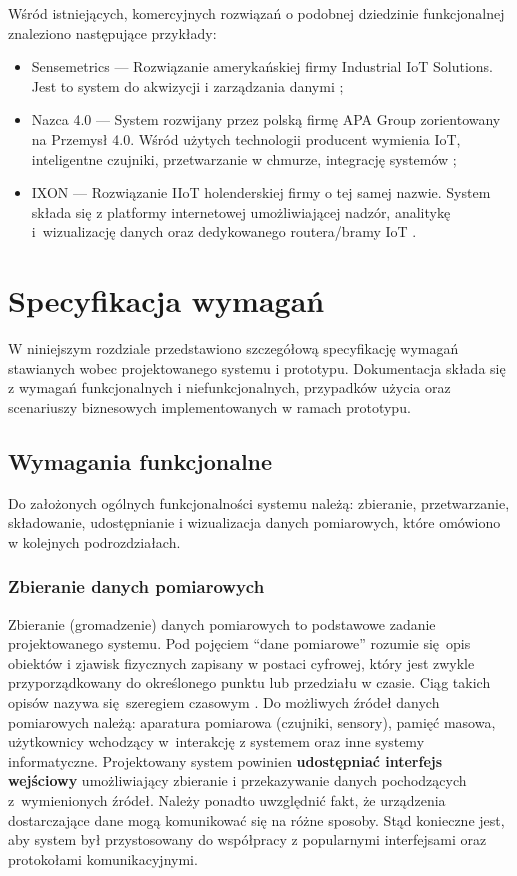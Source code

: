 \documentclass[a4paper, 12pt, twoside]{article}
\begin{document}
Wśród istniejących, komercyjnych rozwiązań o podobnej dziedzinie funkcjonalnej
znaleziono następujące przykłady:
\begin{itemize}
      \itemsep0em
      \item Sensemetrics --- Rozwiązanie amerykańskiej firmy Industrial IoT Solutions.
            Jest to system do akwizycji i zarządzania danymi \cite{sensmetrics};
      \item Nazca 4.0 --- System rozwijany przez polską firmę APA Group zorientowany na Przemysł 4.0.
            Wśród użytych technologii producent wymienia IoT, inteligentne czujniki,
            przetwarzanie w chmurze, integrację systemów \cite{nazca};
      \item IXON --- Rozwiązanie IIoT holenderskiej firmy o tej samej nazwie.
            System składa się z platformy internetowej umożliwiającej nadzór, analitykę i~wizualizację danych oraz
            dedykowanego routera/bramy IoT \cite{ixon}.
\end{itemize}



\section{Specyfikacja wymagań}\label{wymagania}

W niniejszym rozdziale przedstawiono szczegółową specyfikację wymagań
stawianych wobec projektowanego systemu i prototypu. Dokumentacja składa się
z wymagań funkcjonalnych i niefunkcjonalnych, przypadków użycia oraz scenariuszy
biznesowych implementowanych w ramach prototypu.

\subsection{Wymagania funkcjonalne}

Do założonych ogólnych funkcjonalności systemu należą: zbieranie, przetwarzanie,
składowanie, udostępnianie i wizualizacja danych pomiarowych, które omówiono
w kolejnych podrozdziałach.

\subsubsection{Zbieranie danych pomiarowych}

Zbieranie (gromadzenie) danych pomiarowych to podstawowe zadanie projektowanego systemu.
Pod pojęciem ``dane pomiarowe'' rozumie się opis obiektów i zjawisk fizycznych
zapisany w postaci cyfrowej, który jest zwykle przyporządkowany do określonego
punktu lub przedziału w czasie. Ciąg takich opisów nazywa się szeregiem czasowym \cite{time-series}.
Do możliwych źródeł danych pomiarowych należą: aparatura pomiarowa (czujniki, sensory),
pamięć masowa, użytkownicy wchodzący w~interakcję z systemem oraz inne systemy informatyczne.
Projektowany system powinien \textbf{udostępniać interfejs wejściowy} umożliwiający zbieranie
i przekazywanie danych pochodzących z~wymienionych źródeł. Należy ponadto uwzględnić
fakt, że urządzenia dostarczające dane mogą komunikować się na różne sposoby.
Stąd konieczne jest, aby system był przystosowany do współpracy z popularnymi
interfejsami oraz protokołami komunikacyjnymi.
\end{document}
